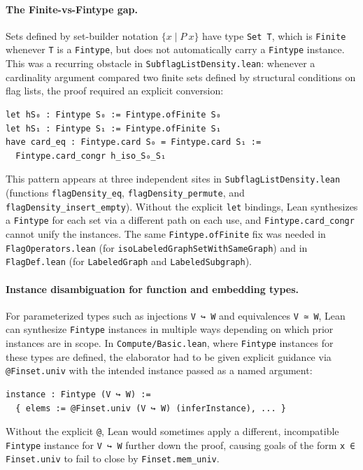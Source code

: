\documentclass{article}
\newcommand{\lean}[1]{\texttt{#1}}
\begin{document}
\paragraph{The Finite-vs-Fintype gap.}
Sets defined by set-builder notation $\{x \mid P\ x\}$ have type
\lean{Set T}, which is \lean{Finite} whenever \lean{T} is a \lean{Fintype},
but does not automatically carry a \lean{Fintype} instance.  This was a
recurring obstacle in \lean{SubflagListDensity.lean}: whenever a cardinality
argument compared two finite sets defined by structural conditions on flag lists,
the proof required an explicit conversion:
\begin{lstlisting}
let hS₀ : Fintype S₀ := Fintype.ofFinite S₀
let hS₁ : Fintype S₁ := Fintype.ofFinite S₁
have card_eq : Fintype.card S₀ = Fintype.card S₁ :=
  Fintype.card_congr h_iso_S₀_S₁
\end{lstlisting}
This pattern appears at three independent sites in \lean{SubflagListDensity.lean}
(functions \lean{flagDensity\_eq}, \lean{flagDensity\_permute}, and
\lean{flagDensity\_insert\_empty}).  Without the explicit \lean{let} bindings,
Lean synthesizes a \lean{Fintype} for each set via a different path on each
use, and \lean{Fintype.card\_congr} cannot unify the instances.  The same
\lean{Fintype.ofFinite} fix was needed in \lean{FlagOperators.lean} (for
\lean{isoLabeledGraphSetWithSameGraph}) and in \lean{FlagDef.lean} (for
\lean{LabeledGraph} and \lean{LabeledSubgraph}).

\paragraph{Instance disambiguation for function and embedding types.}
For parameterized types such as injections \lean{V ↪ W} and equivalences
\lean{V ≃ W}, Lean can synthesize \lean{Fintype} instances in multiple ways
depending on which prior instances are in scope.  In
\lean{Compute/Basic.lean}, where \lean{Fintype} instances for these types are
defined, the elaborator had to be given explicit guidance via
\lean{@Finset.univ} with the intended instance passed as a named argument:
\begin{lstlisting}
instance : Fintype (V ↪ W) :=
  { elems := @Finset.univ (V ↪ W) (inferInstance), ... }
\end{lstlisting}
Without the explicit \lean{@}, Lean would sometimes apply a different,
incompatible \lean{Fintype} instance for \lean{V ↪ W} further down the proof,
causing goals of the form \lean{x ∈ Finset.univ} to fail to close by
\lean{Finset.mem\_univ}.
\end{document}
